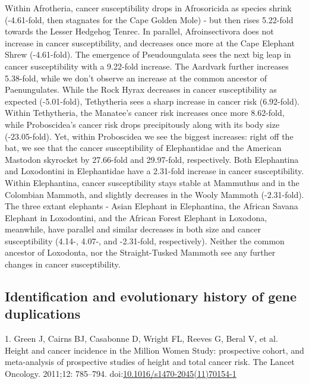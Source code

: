 \documentclass[]{elsarticle} %
\begin{document}
Within Afrotheria, cancer susceptibility drops in Afrosoricida as
species shrink (-4.61-fold, then stagnates for the Cape Golden Mole) -
but then rises 5.22-fold towards the Lesser Hedgehog Tenrec. In
parallel, Afroinsectivora does not increase in cancer susceptibility,
and decreases once more at the Cape Elephant Shrew (-4.61-fold). The
emergence of Pseudoungulata sees the next big leap in cancer
susceptibility with a 9.22-fold increase. The Aardvark further increases
5.38-fold, while we don't observe an increase at the common ancestor of
Paenungulates. While the Rock Hyrax decreases in cancer susceptibility
as expected (-5.01-fold), Tethytheria sees a sharp increase in cancer
risk (6.92-fold). Within Tethytheria, the Manatee's cancer risk
increases once more 8.62-fold, while Proboscidea's cancer risk drops
precipitously along with its body size (-23.05-fold). Yet, within
Proboscidea we see the biggest increases: right off the bat, we see that
the cancer susceptibility of Elephantidae and the American Mastodon
skyrocket by 27.66-fold and 29.97-fold, respectively. Both Elephantina
and Loxodontini in Elephantidae have a 2.31-fold increase in cancer
susceptibility. Within Elephantina, cancer susceptibility stays stable
at Mammuthus and in the Colombian Mammoth, and slightly decreases in the
Wooly Mammoth (-2.31-fold). The three extant elephants - Asian Elephant
in Elephantina, the African Savana Elephant in Loxodontini, and the
African Forest Elephant in Loxodona, meanwhile, have parallel and
similar decreases in both size and cancer susceptibility (4.14-, 4.07-,
and -2.31-fold, respectively). Neither the common ancestor of Loxodonta,
nor the Straight-Tusked Mammoth see any further changes in cancer
susceptibility.

\hypertarget{identification-and-evolutionary-history-of-gene-duplications}{%
\subsection*{Identification and evolutionary history of gene
duplications}\label{identification-and-evolutionary-history-of-gene-duplications}}

\hypertarget{refs}{}
\leavevmode\hypertarget{ref-Green2011}{}%
1. Green J, Cairns BJ, Casabonne D, Wright FL, Reeves G, Beral V, et al.
Height and cancer incidence in the Million Women Study: prospective
cohort, and meta-analysis of prospective studies of height and total
cancer risk. The Lancet Oncology. 2011;12: 785--794.
doi:\href{https://doi.org/10.1016/s1470-2045(11)70154-1}{10.1016/s1470-2045(11)70154-1}
\end{document}
